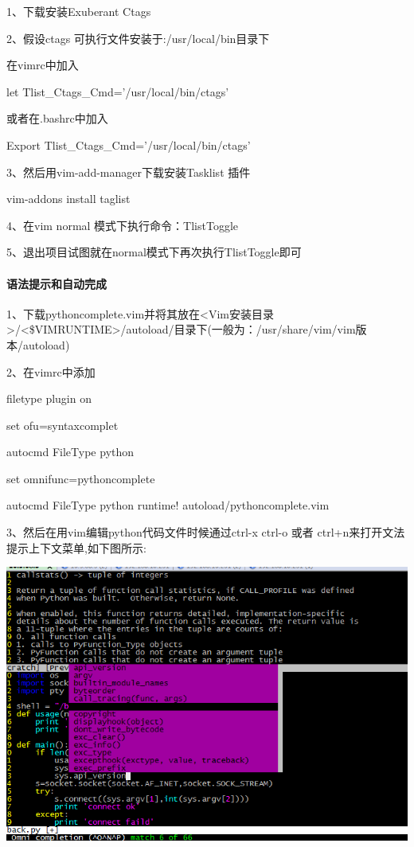 \documentclass[letterpaper,10pt]{sphinxmanual}
\begin{document}
1、下载安装Exuberant Ctags

2、假设ctags 可执行文件安装于:/usr/local/bin目录下

在vimrc中加入

let Tlist\_Ctags\_Cmd='/usr/local/bin/ctags'

或者在.bashrc中加入

Export Tlist\_Ctags\_Cmd='/usr/local/bin/ctags'

3、然后用vim-add-manager下载安装Tasklist 插件

vim-addons install taglist

4、在vim normal 模式下执行命令：TlistToggle

5、退出项目试图就在normal模式下再次执行TlistToggle即可


\paragraph{语法提示和自动完成}
\label{Linux_vim/install:id6}
1、下载pythoncomplete.vim并将其放在\textless{}Vim安装目录\textgreater{}/\textless{}\$VIMRUNTIME\textgreater{}/autoload/目录下(一般为：/usr/share/vim/vim版本/autoload)

2、在vimrc中添加

filetype plugin on

set ofu=syntaxcomplet

autocmd FileType python

set omnifunc=pythoncomplete

autocmd FileType python runtime! autoload/pythoncomplete.vim

3、然后在用vim编辑python代码文件时候通过ctrl-x ctrl-o 或者 ctrl+n来打开文法提示上下文菜单,如下图所示:

\includegraphics{menu.png}
\end{document}
